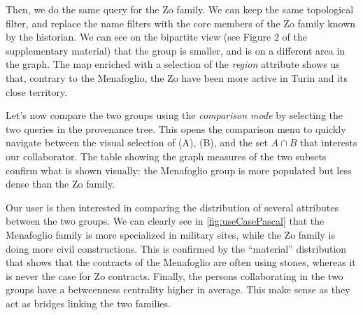 Then, we do the same query for the Zo family. We can keep the same topological filter, and replace the name filters with the core members of the Zo family known by the historian. We can see on the bipartite view (see Figure 2 of the supplementary material) that the group is smaller, and is on a different area in the graph. The map enriched with a selection of the \textit{region} attribute shows us that, contrary to the Menafoglio, the Zo have been more active in Turin and its close territory.

Let's now compare the two groups using the \textit{comparison mode} by selecting the two queries in the provenance tree. This opens the comparison menu to quickly navigate between the visual selection of (A), (B), and the set $A \cap B$ that interests our collaborator. The table showing the graph measures of the two subsets confirm what is shown visually: the Menafoglio group is more populated but less dense than the Zo family.

Our user is then interested in comparing the distribution of several attributes between the two groups. We can clearly see in \autoref{fig:useCasePascal} that the Menafoglio family is more specialized in military sites, while the Zo family is doing more civil constructions. This is confirmed by the ``material'' distribution that shows that the contracts of the Menafoglio are often using stones, whereas it is never the case for Zo contracts. Finally, the persons collaborating in the two groups have a betweenness centrality higher in average. This make sense as they act as bridges linking the two families.



